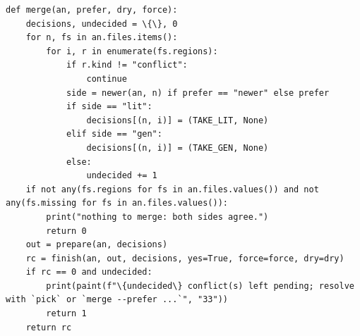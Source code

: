 \documentclass[10pt,a4paper]{article}
\begin{document}
\begin{Verbatim}
def merge(an, prefer, dry, force):
    decisions, undecided = \{\}, 0
    for n, fs in an.files.items():
        for i, r in enumerate(fs.regions):
            if r.kind != "conflict":
                continue
            side = newer(an, n) if prefer == "newer" else prefer
            if side == "lit":
                decisions[(n, i)] = (TAKE_LIT, None)
            elif side == "gen":
                decisions[(n, i)] = (TAKE_GEN, None)
            else:
                undecided += 1
    if not any(fs.regions for fs in an.files.values()) and not any(fs.missing for fs in an.files.values()):
        print("nothing to merge: both sides agree.")
        return 0
    out = prepare(an, decisions)
    rc = finish(an, out, decisions, yes=True, force=force, dry=dry)
    if rc == 0 and undecided:
        print(paint(f"\{undecided\} conflict(s) left pending; resolve with `pick` or `merge --prefer ...`", "33"))
        return 1
    return rc
\end{Verbatim}
\end{document}
